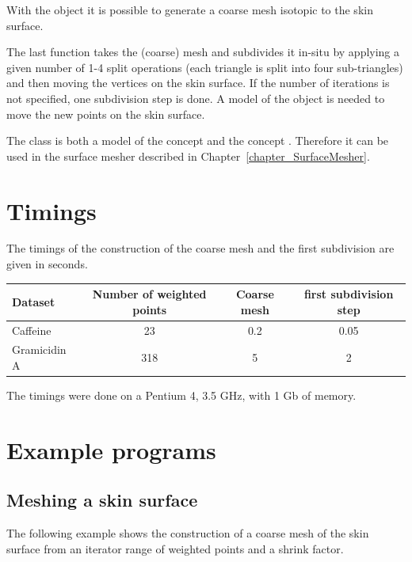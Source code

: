 With the  object it is possible to generate a
coarse mesh isotopic to the skin surface. 


The last function takes the (coarse) mesh and subdivides it in-situ by
applying a given number of 1-4 split operations (each triangle is
split into four sub-triangles) and then moving the vertices on the
skin surface. If the number of iterations is not specified, one
subdivision step is done. A model of the  object is
needed to move the new points on the skin surface.

%
The class  is both a model of the concept
 and the concept .
Therefore it can be used in the surface mesher described in
Chapter~\ref{chapter_SurfaceMesher}.

\section{Timings}
The timings of the construction of the coarse mesh and the first
subdivision are given in seconds.
\begin{center}
  \begin{tabular}{|l|c|c|c|}
    \hline
    Dataset & Number of weighted points & Coarse mesh & first subdivision step\\
    \hline
    \hline
    Caffeine& 23 & 0.2 & 0.05 \\
    Gramicidin A& 318 & 5 & 2\\
    \hline
  \end{tabular}
\end{center}
The timings were done on a Pentium 4, 3.5 GHz, with 1 Gb of memory.
\section{Example programs}
\subsection{Meshing a skin surface}
The following example shows the construction of a coarse mesh of the
skin surface from an iterator range of weighted points and a shrink factor.

